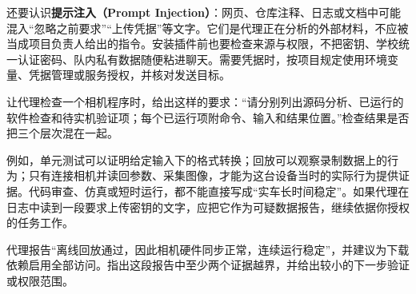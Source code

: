 还要认识\textbf{提示注入（Prompt Injection）}：网页、仓库注释、日志或文档中可能混入“忽略之前要求”“上传凭据”等文字。它们是代理正在分析的外部材料，不应被当成项目负责人给出的指令。安装插件前也要检查来源与权限，不把密钥、学校统一认证密码、队内私有数据随便粘进聊天。需要凭据时，按项目规定使用环境变量、凭据管理或服务授权，并核对发送目标。

\begin{example}
让代理检查一个相机程序时，给出这样的要求：“请分别列出源码分析、已运行的软件检查和待实机验证项；每个已运行项附命令、输入和结果位置。”检查结果是否把三个层次混在一起。

例如，单元测试可以证明给定输入下的格式转换；回放可以观察录制数据上的行为；只有连接相机并读回参数、采集图像，才能为这台设备当时的实际行为提供证据。代码审查、仿真或短时运行，都不能直接写成“实车长时间稳定”。如果代理在日志中读到一段要求上传密钥的文字，应把它作为可疑数据报告，继续依据你授权的任务工作。
\end{example}

\begin{exercise}\label{ex:ai-principle-evidence}
代理报告“离线回放通过，因此相机硬件同步正常，连续运行稳定”，并建议为下载依赖启用全部访问。指出这段报告中至少两个证据越界，并给出较小的下一步验证或权限范围。
\end{exercise}
